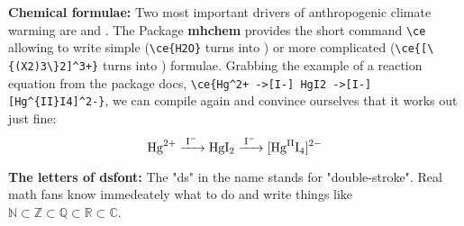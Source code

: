\textbf{Chemical formulae:} Two most important drivers of anthropogenic climate warming are  and .
The Package \textbf{mhchem} provides the short command \Verb+\ce+ allowing to write simple (\Verb+\ce{H2O}+ turns into ) or more complicated (\Verb|\ce{[\{(X2)3\}2]^3+}| turns into ) formulae. Grabbing the example of a reaction equation from the package docs, \Verb?\ce{Hg^2+ ->[I-] HgI2 ->[I-] [Hg^{II}I4]^2-}?, we can compile again and convince ourselves that it works out just fine:
\begin{equation}
\ce{Hg^2+ ->[I-] HgI2 ->[I-] [Hg^{II}I4]^2-}
\end{equation}

\textbf{The letters of dsfont:} The "ds" in the name stands for "double-stroke". Real math fans know immedeately what to do and write things like $\mathds{N} \subset \mathds{Z} \subset \mathds{Q} \subset \mathds{R} \subset \mathds{C}$.




